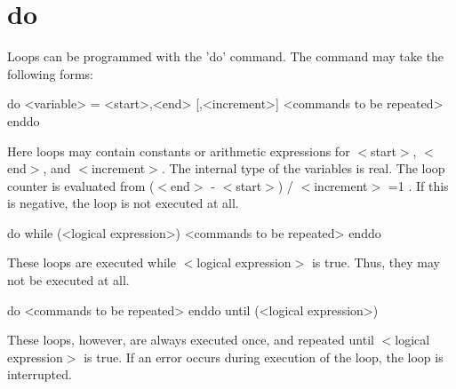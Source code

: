 \section{do}
Loops can be programmed with the 'do' command. The command may take 
the  following forms: 
\begin{MacVerbatim}
do <variable> = <start>,<end> [,<increment>]
  <commands to be repeated>
enddo
\end{MacVerbatim}
Here loops may contain constants or arithmetic expressions 
for $ <$start$> $, $ <$end$> $, and $ <$increment$> $. The internal type of the 
variables is real. The loop counter is evaluated from 
($ <$end$> $ - $ <$start$> $) / $ <$increment$> $ =1 . If this is negative, the loop 
is not executed at all. 
\par
\begin{MacVerbatim}
do while (<logical expression>)
  <commands to be repeated>
enddo
\end{MacVerbatim}
These loops are executed while $ <$logical expression$> $ is true. 
Thus, they may not be executed at all. 
\begin{MacVerbatim}
do
  <commands to be repeated>
enddo until (<logical expression>)
\end{MacVerbatim}
These loops, however, are always executed once, and repeated 
until $ <$logical expression$> $ is true. 
If an error occurs during execution of the loop, the loop is 
interrupted. 
